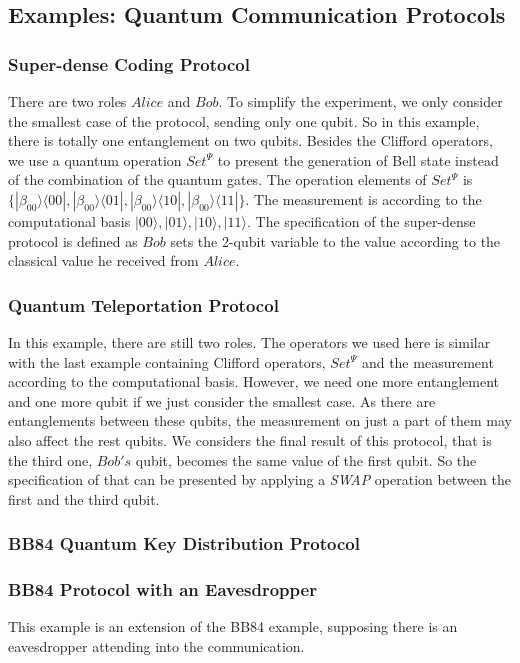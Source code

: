 \documentclass[runningheads]{llncs}
\begin{document}
\subsection{Examples: Quantum Communication Protocols}
\subsubsection{Super-dense Coding Protocol} There are two roles $Alice$ and $Bob$. To simplify the experiment, we only consider the smallest case of the protocol, sending only one qubit. So in this example, there is totally one entanglement on two qubits. Besides the Clifford operators, we use a quantum operation $Set^{\Psi}$ to present the generation of Bell state instead of the combination of the quantum gates. The operation elements of $Set^{\Psi}$ is $\{|\beta_{00}\rangle\langle00|,|\beta_{00}\rangle\langle01|,|\beta_{00}\rangle\langle10|,|\beta_{00}\rangle\langle11|\}$. The measurement is according to the computational basis $|00\rangle,|01\rangle,|10\rangle,|11\rangle$. The specification of the super-dense protocol is defined as $Bob$ sets the 2-qubit variable to the value according to the classical value he received from $Alice$.
\subsubsection{Quantum Teleportation Protocol} In this example, there are still two roles. The operators we used here is similar with the last example containing Clifford operators, $Set^{\Psi}$ and the measurement according to the computational basis. However, we need one more entanglement and one more qubit if we just consider the smallest case. As there are entanglements between these qubits, the measurement on just a part of them may also affect the rest qubits. We considers the final result of this protocol, that is the third one, $Bob's$ qubit, becomes the same value of the first qubit. So the specification of that can be presented by applying a \textit{SWAP} operation between the first and the third qubit.
\subsubsection{BB84 Quantum Key Distribution Protocol}
\subsubsection{BB84 Protocol with an Eavesdropper} This example is an extension of the BB84 example, supposing there is an eavesdropper attending into the communication. 
\end{document}
